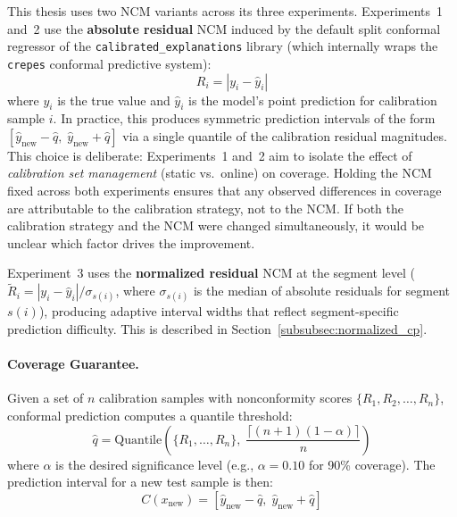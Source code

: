 This thesis uses two NCM variants across its three experiments. Experiments~1 and~2 use the \textbf{absolute residual} NCM induced by the default split conformal regressor of the \texttt{calibrated\_explanations} library (which internally wraps the \texttt{crepes} conformal predictive system):
\begin{equation}
    R_i = |y_i - \hat{y}_i|
    \label{eq:nonconformity}
\end{equation}
where $y_i$ is the true value and $\hat{y}_i$ is the model's point prediction for calibration sample $i$. In practice, this produces symmetric prediction intervals of the form $[\hat{y}_{\text{new}} - \hat{q},\; \hat{y}_{\text{new}} + \hat{q}]$ via a single quantile of the calibration residual magnitudes. This choice is deliberate: Experiments~1 and~2 aim to isolate the effect of \emph{calibration set management} (static vs.\ online) on coverage. Holding the NCM fixed across both experiments ensures that any observed differences in coverage are attributable to the calibration strategy, not to the NCM. If both the calibration strategy and the NCM were changed simultaneously, it would be unclear which factor drives the improvement.

Experiment~3 uses the \textbf{normalized residual} NCM at the segment level ($\tilde{R}_i = |y_i - \hat{y}_i| / \sigma_{s(i)}$, where $\sigma_{s(i)}$ is the median of absolute residuals for segment $s(i)$), producing adaptive interval widths that reflect segment-specific prediction difficulty. This is described in Section~\ref{subsubsec:normalized_cp}.

\paragraph{Coverage Guarantee.}
Given a set of $n$ calibration samples with nonconformity scores $\{R_1, R_2, \ldots, R_n\}$, conformal prediction computes a quantile threshold:
\begin{equation}
    \hat{q} = \text{Quantile}\left(\{R_1, \ldots, R_n\},\; \frac{\lceil (n+1)(1-\alpha) \rceil}{n}\right)
    \label{eq:quantile}
\end{equation}
where $\alpha$ is the desired significance level (e.g., $\alpha = 0.10$ for 90\% coverage). The prediction interval for a new test sample is then:
\begin{equation}
    C(x_{\text{new}}) = \left[\hat{y}_{\text{new}} - \hat{q},\; \hat{y}_{\text{new}} + \hat{q}\right]
    \label{eq:interval}
\end{equation}

